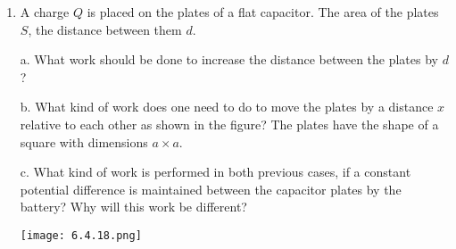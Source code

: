 \documentclass{article}
\begin{document}
\begin{enumerate}[label=6.4.\arabic*]
\item A charge $Q$ is placed on the plates of a flat capacitor. The area of the plates $S$, the distance between them $d$.

a. What work should be done to increase the distance between the plates by $d$?

b. What kind of work does one need to do to move the plates by a distance $x$ relative to each other as shown in the figure? The plates have the shape of a square with dimensions $a \times a$.

c. What kind of work is performed in both previous cases, if a constant potential difference is maintained between the capacitor plates by the battery? Why will this work be different?

\begin{center}
    \texttt{[image: 6.4.18.png]}
\end{center}


\end{enumerate}
\end{document}
